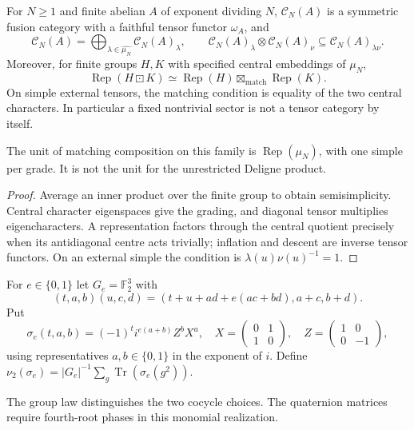 \begin{proposition}
{\normalfont\statusSketch}\quad For $N\geq1$ and finite abelian $A$ of
exponent dividing $N$, $\mathcal C_N(A)$ is a symmetric fusion
category with a faithful tensor functor $\omega_A$, and
\[
\mathcal C_N(A)=\bigoplus_{\lambda\in\widehat{\mu_N}}
\mathcal C_N(A)_\lambda,\qquad
\mathcal C_N(A)_\lambda\otimes\mathcal C_N(A)_\nu
\subseteq\mathcal C_N(A)_{\lambda\nu}.
\]
Moreover, for finite groups $H,K$ with specified central embeddings of $\mu_N$,
\[
\operatorname{Rep}(H\boxdot K)\simeq
\operatorname{Rep}(H)\boxtimes_{\mathrm{match}}\operatorname{Rep}(K).
\]
On simple external tensors, the matching condition is equality of the
two central characters. In particular a fixed nontrivial sector is not
a tensor category by itself.
\end{proposition}
\begin{scope}The unit of matching composition on this family is
$\operatorname{Rep}(\mu_N)$, with one simple per grade. It is not the
unit for the unrestricted Deligne product.\end{scope}
\begin{proof}
Average an inner product over the finite group to obtain semisimplicity.
Central character eigenspaces give the grading, and diagonal tensor
multiplies eigencharacters. A representation factors through the central
quotient precisely when its antidiagonal centre acts trivially; inflation
and descent are inverse tensor functors. On an external simple the
condition is $\lambda(u)\nu(u)^{-1}=1$.
\end{proof}

\begin{definition}
For $e\in\{0,1\}$ let $G_e=\mathbb F_2^3$ with
\[
(t,a,b)(u,c,d)=(t+u+ad+e(ac+bd),a+c,b+d).
\]
Put
\[
\sigma_e(t,a,b)=(-1)^t i^{e(a+b)}Z^bX^a,\quad
X=\begin{pmatrix}0&1\\1&0\end{pmatrix},\quad
Z=\begin{pmatrix}1&0\\0&-1\end{pmatrix},
\]
using representatives $a,b\in\{0,1\}$ in the exponent of $i$. Define
$\nu_2(\sigma_e)=|G_e|^{-1}\sum_g\operatorname{Tr}(\sigma_e(g^2))$.
\end{definition}
\begin{scope}The group law distinguishes the two cocycle choices. The
quaternion matrices require fourth-root phases in this monomial realization.\end{scope}

